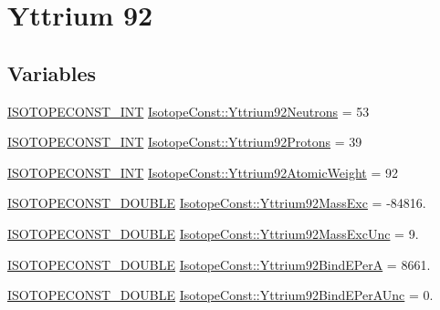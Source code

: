 \hypertarget{group___isotope_const-_yttrium-_y92}{}\section{Yttrium 92}
\label{group___isotope_const-_yttrium-_y92}
\subsection*{Variables}
\begin{DoxyCompactItemize}
\item 
\mbox{\hyperlink{group___isotope_const-_macros_ga5f18360b3e99483a35c32d789e62621c}{I\+S\+O\+T\+O\+P\+E\+C\+O\+N\+S\+T\+\_\+\+I\+NT}} \mbox{\hyperlink{group___isotope_const-_yttrium-_y92_ga1a5650e5243a045c86c9111545993897}{Isotope\+Const\+::\+Yttrium92\+Neutrons}} = 53
\item 
\mbox{\hyperlink{group___isotope_const-_macros_ga5f18360b3e99483a35c32d789e62621c}{I\+S\+O\+T\+O\+P\+E\+C\+O\+N\+S\+T\+\_\+\+I\+NT}} \mbox{\hyperlink{group___isotope_const-_yttrium-_y92_ga025effd3845709e2f68dcbf9f3fd0c5a}{Isotope\+Const\+::\+Yttrium92\+Protons}} = 39
\item 
\mbox{\hyperlink{group___isotope_const-_macros_ga5f18360b3e99483a35c32d789e62621c}{I\+S\+O\+T\+O\+P\+E\+C\+O\+N\+S\+T\+\_\+\+I\+NT}} \mbox{\hyperlink{group___isotope_const-_yttrium-_y92_ga1115f93385d3294d1469f49f2486008e}{Isotope\+Const\+::\+Yttrium92\+Atomic\+Weight}} = 92
\item 
\mbox{\hyperlink{group___isotope_const-_macros_ga8f45a7272ce02c0b4c65c44636ed719a}{I\+S\+O\+T\+O\+P\+E\+C\+O\+N\+S\+T\+\_\+\+D\+O\+U\+B\+LE}} \mbox{\hyperlink{group___isotope_const-_yttrium-_y92_ga6b7eda9d68e5a911422286c13926ed6d}{Isotope\+Const\+::\+Yttrium92\+Mass\+Exc}} = -\/84816.
\item 
\mbox{\hyperlink{group___isotope_const-_macros_ga8f45a7272ce02c0b4c65c44636ed719a}{I\+S\+O\+T\+O\+P\+E\+C\+O\+N\+S\+T\+\_\+\+D\+O\+U\+B\+LE}} \mbox{\hyperlink{group___isotope_const-_yttrium-_y92_ga399c106bab3085b6657fdff8d5ed527c}{Isotope\+Const\+::\+Yttrium92\+Mass\+Exc\+Unc}} = 9.
\item 
\mbox{\hyperlink{group___isotope_const-_macros_ga8f45a7272ce02c0b4c65c44636ed719a}{I\+S\+O\+T\+O\+P\+E\+C\+O\+N\+S\+T\+\_\+\+D\+O\+U\+B\+LE}} \mbox{\hyperlink{group___isotope_const-_yttrium-_y92_gaba473577bf844b7f9443fbc9d4f07a2c}{Isotope\+Const\+::\+Yttrium92\+Bind\+E\+PerA}} = 8661.
\item 
\mbox{\hyperlink{group___isotope_const-_macros_ga8f45a7272ce02c0b4c65c44636ed719a}{I\+S\+O\+T\+O\+P\+E\+C\+O\+N\+S\+T\+\_\+\+D\+O\+U\+B\+LE}} \mbox{\hyperlink{group___isotope_const-_yttrium-_y92_gaf19aefb6b85a26b57cf10a055f061bb4}{Isotope\+Const\+::\+Yttrium92\+Bind\+E\+Per\+A\+Unc}} = 0.

\end{DoxyCompactItemize}
